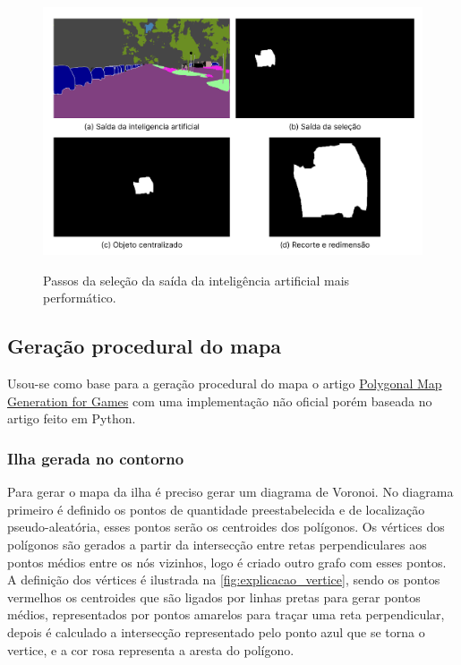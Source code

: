 \begin{figure}[!ht]
	\centering
    \caption{Passos da seleção da saída da inteligência  artificial mais performático.}
	\includegraphics[width=1.0\textwidth]{figures/saidas_selecao.png}
	\label{fig:saidas_selecao_perf}
\end{figure}

\subsection{Geração procedural do mapa}

Usou-se como base para a geração procedural do mapa o artigo \hyperref[sec:geracaoProcedural]{Polygonal Map Generation for Games} com uma implementação não oficial porém baseada no artigo feito em Python.

\subsubsection{Ilha gerada no contorno}

Para gerar o mapa da ilha é preciso gerar um diagrama de Voronoi. No diagrama primeiro é definido os pontos de quantidade preestabelecida e de localização pseudo-aleatória, esses pontos serão os centroides dos polígonos. Os vértices dos polígonos são gerados a partir da intersecção entre retas perpendiculares aos pontos médios entre os nós vizinhos, logo é criado outro grafo com esses pontos. A definição dos vértices é ilustrada na \cref{fig:explicacao_vertice}, sendo os pontos vermelhos os centroides que são ligados por linhas pretas para gerar pontos médios, representados por pontos amarelos para traçar uma reta perpendicular, depois é calculado a intersecção representado pelo ponto azul que se torna o vertice, e a cor rosa representa a aresta do polígono.

